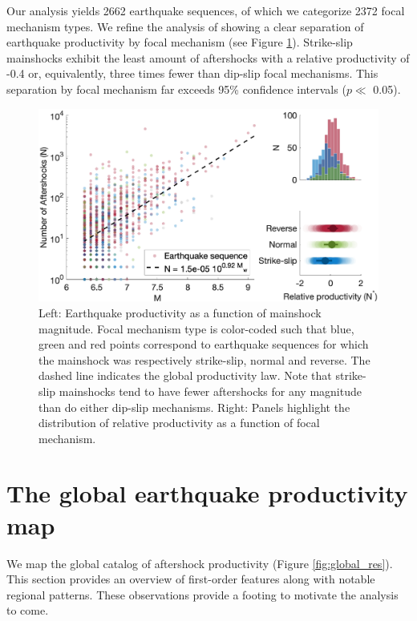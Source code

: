 \documentclass[12pt, notitlepage]{report}
\begin{document}
Our analysis yields 2662 earthquake sequences, of which we categorize 2372  focal mechanism types. We refine the analysis of \textcite{Tahir2015} showing a clear separation of earthquake productivity by focal mechanism (see Figure \ref{fig:fms_prod}). Strike-slip mainshocks exhibit the least amount of aftershocks with a relative productivity of -0.4 or, equivalently, three times fewer than dip-slip focal mechanisms. This separation by focal mechanism far exceeds 95\% confidence intervals ($p\ll $ 0.05). 

\begin{figure}[!ht]
    \centering
    \includegraphics[width = \textwidth]{figures/fms_prod.eps}
    \caption{Left: Earthquake productivity as a function of mainshock magnitude. Focal mechanism type is color-coded such that blue, green and red points correspond to earthquake sequences for which the mainshock was respectively strike-slip, normal and reverse. The dashed line indicates the global productivity law. Note that strike-slip mainshocks tend to have fewer aftershocks for any magnitude than do either dip-slip mechanisms. Right: Panels highlight the distribution of relative productivity as a function of focal mechanism.}
    \label{fig:fms_prod}
\end{figure}

\section{The global earthquake productivity map}

We map the global catalog of aftershock productivity (Figure \ref{fig:global_res}). This section provides an overview of first-order features along with notable regional patterns. These observations provide a footing to motivate the analysis to come.
\end{document}
